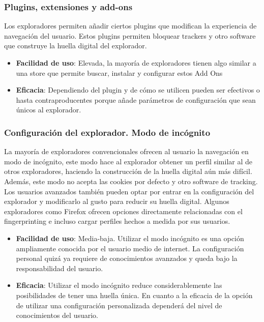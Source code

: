 \documentclass[10pt,a4paper]{article}
\begin{document}
\subsubsection*{Plugins, extensiones y add-ons}
Los exploradores permiten añadir ciertos plugins que modifican la experiencia de navegación del usuario. Estos plugins permiten bloquear trackers y otro software que construye la huella digital del explorador.\\

\begin{itemize}
\item \textbf{Facilidad de uso}: Elevada, la mayoría de exploradores tienen algo similar a una store que permite buscar, instalar y configurar estos Add Ons
\item \textbf{Eficacia}: Dependiendo del plugin y de cómo se utilicen pueden ser efectivos o hasta contraproducentes porque añade parámetros de configuración que sean únicos al explorador.
\end{itemize}

\subsubsection*{Configuración del explorador. Modo de incógnito}
La mayoría de exploradores convencionales ofrecen al usuario la navegación en modo de incógnito, este modo hace al explorador obtener un perfil similar al de otros exploradores, haciendo la construcción de la huella digital aún más difícil. Además, este modo no acepta las cookies por defecto y otro software de tracking.\\

Los usuarios avanzados también pueden optar por entrar en la configuración del explorador y modificarlo al gusto para reducir su huella digital. Algunos exploradores como Firefox ofrecen opciones directamente relacionadas con el fingerprinting e incluso cargar perfiles hechos a medida por sus usuarios.

\begin{itemize}
\item \textbf{Facilidad de uso}: Media-baja. Utilizar el modo incógnito es una opción ampliamente conocida por el usuario medio de internet. La configuración personal quizá ya requiere de conocimientos avanzados y queda bajo la responsabilidad del usuario.
\item \textbf{Eficacia}: Utilizar el modo incógnito reduce considerablemente las posibilidades de tener una huella única. En cuanto a la eficacia de la opción de utilizar una configuración personalizada dependerá del nivel de conocimientos del usuario.
\end{itemize}
\end{document}
